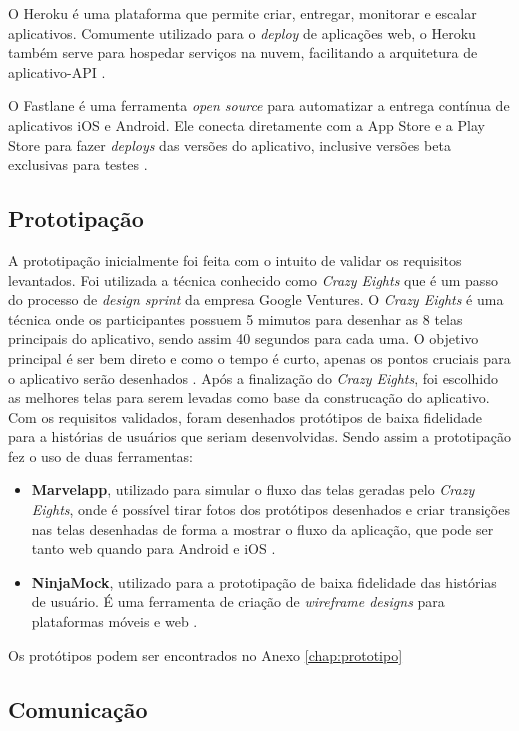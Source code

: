 O Heroku é uma plataforma que permite criar, entregar, monitorar e escalar aplicativos. Comumente utilizado para o \textit{deploy} de aplicações web, o Heroku também serve para hospedar serviços na nuvem, facilitando a arquitetura de aplicativo-API \cite{heroku}.

O Fastlane é uma ferramenta \textit{open source} para automatizar a entrega contínua de aplicativos iOS e Android. Ele conecta diretamente com a App Store e a Play Store para fazer \textit{deploys} das versões do aplicativo, inclusive versões beta exclusivas para testes \cite{fastlane}.

\subsection{Prototipação}

A prototipação inicialmente foi feita com o intuito de validar os requisitos levantados. Foi utilizada a técnica conhecido como \textit{Crazy Eights} que é um passo do processo de \textit{design sprint} da empresa Google Ventures.
O \textit{Crazy Eights} é uma técnica onde os participantes possuem 5 mimutos para desenhar as 8 telas principais do aplicativo, sendo assim 40 segundos para cada uma. O objetivo principal é ser bem direto e como o tempo é curto, apenas os pontos cruciais para o aplicativo serão desenhados \cite{knapp}.
Após a finalização do \textit{Crazy Eights}, foi escolhido as melhores telas para serem levadas como base da construcação do aplicativo.
Com os requisitos validados, foram desenhados protótipos de baixa fidelidade para a histórias de usuários que seriam desenvolvidas.
Sendo assim a prototipação fez o uso de duas ferramentas:
\begin{itemize}
    \item \textbf{Marvelapp}, utilizado para simular o fluxo das telas geradas pelo \textit{Crazy Eights}, onde é possível tirar fotos dos protótipos desenhados e criar transições nas telas desenhadas de forma a mostrar o fluxo da aplicação, que pode ser tanto web quando para Android e iOS \cite{marvelapp}.
    \item \textbf{NinjaMock}, utilizado para a prototipação de baixa fidelidade das histórias de usuário. É uma ferramenta de criação de \textit{wireframe designs} para plataformas móveis e web \cite{ninjamock}.
\end{itemize}
Os protótipos podem ser encontrados no Anexo \ref{chap:prototipo}

\subsection{Comunicação}

